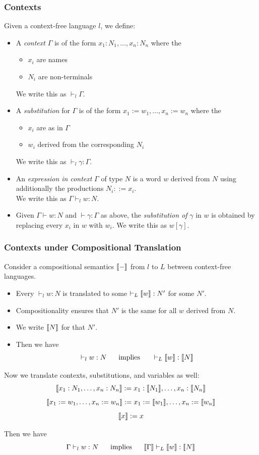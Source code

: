 \begin{frame}\frametitle{Contexts}
Given a context-free language $l$, we define:

\begin{itemize}
 \item A \emph{context} $\Gamma$ is of the form $x_1:N_1,\ldots,x_n:N_n$ where the
  \begin{itemize}
   \item $x_i$ are names
   \item $N_i$ are non-terminals
  \end{itemize}
  We write this as $\vdash_l \Gamma$.
 \item A \emph{substitution} for $\Gamma$ is of the form $x_1:=w_1,\ldots,x_n:=w_n$ where the
  \begin{itemize}
   \item $x_i$ are as in $\Gamma$
   \item $w_i$ derived from the corresponding $N_i$
  \end{itemize}
  We write this as $\vdash_l \gamma:\Gamma$.
 \item An \emph{expression in context} $\Gamma$ of type $N$ is a word $w$ derived from $N$ using additionally the productions $N_i::= x_i$.\\
 We write this as $\Gamma\vdash_l w:N$.
 \item Given $\Gamma\vdash w:N$ and $\vdash \gamma:\Gamma$ as above, the \emph{substitution of} $\gamma$ in $w$ is obtained by replacing every $x_i$ in $w$ with $w_i$.
 We write this as $w[\gamma]$.
\end{itemize}
\end{frame}


\begin{frame}\frametitle{Contexts under Compositional Translation}
Consider a compositional semantics $\llbracket -\rrbracket$ from $l$ to $L$ between context-free languages.

\begin{itemize}
 \item Every $\vdash_l w:N$ is translated to some $\vdash_L \llbracket w\rrbracket:N'$ for some $N'$.
 \item Compositionality ensures that $N'$ is the same for all $w$ derived from $N$.
 \item We write $\llbracket N\rrbracket$ for that $N'$.
 \item Then we have 
  \[\vdash_l w:N \hspace*{.5cm}\;\mathrm{implies}\;\hspace*{.5cm} \vdash_L \llbracket w\rrbracket:\llbracket N\rrbracket\]
\end{itemize}

Now we translate contexts, substitutions, and variables as well:
\[\llbracket x_1:N_1,\ldots,x_n:N_n\rrbracket:=x_1:\llbracket N_1\rrbracket,\ldots,x_n:\llbracket N_n\rrbracket\]
\[\llbracket x_1:=w_1,\ldots,x_n:=w_n\rrbracket:=x_1:=\llbracket w_1\rrbracket,\ldots,x_n:=\llbracket w_n\rrbracket\]
\[\llbracket x\rrbracket:=x\]

Then we have
  \[\Gamma\vdash_l w:N \hspace*{.5cm}\;\mathrm{implies}\;\hspace*{.5cm} \llbracket \Gamma\rrbracket\vdash_L \llbracket w\rrbracket:\llbracket N\rrbracket\]
\end{frame}

